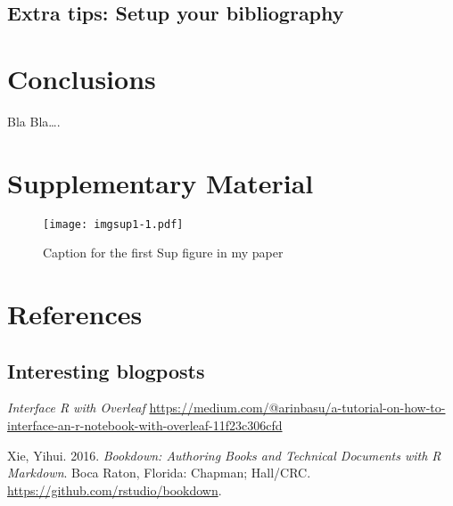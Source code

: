 \documentclass[12pt,]{article}
\newcommand{\beginsupplement}{\setcounter{table}{0}  \renewcommand{\thetable}{S\arabic{table}} \setcounter{figure}{0} \renewcommand{\thefigure}{S\arabic{figure}}}
\begin{document}
\subsection{Extra tips: Setup your
bibliography}\label{extra-tips-setup-your-bibliography}

\section{Conclusions}\label{conclusions}

Bla Bla\ldots{}.

\newpage

\section*{Supplementary Material}\label{supplementary-material}

\beginsupplement

\begin{figure}
\centering
\texttt{[image: imgsup1-1.pdf]}
\caption{\label{fig:sup1}Caption for the first Sup figure in my paper}
\end{figure}

\section*{References}\label{references}

\subsection{Interesting blogposts}\label{interesting-blogposts}

\emph{Interface R with Overleaf}
\url{https://medium.com/@arinbasu/a-tutorial-on-how-to-interface-an-r-notebook-with-overleaf-11f23c306cfd}

\hypertarget{refs}{}
\hypertarget{ref-bookdown}{}
Xie, Yihui. 2016. \emph{Bookdown: Authoring Books and Technical
Documents with R Markdown}. Boca Raton, Florida: Chapman; Hall/CRC.
\url{https://github.com/rstudio/bookdown}.
\end{document}
